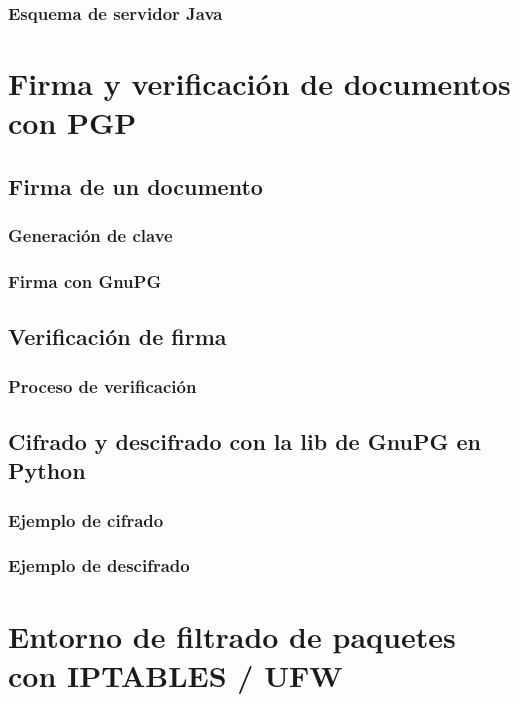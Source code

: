 \documentclass[12pt,a4paper]{article}
\begin{document}
\subsubsection{Esquema de servidor Java}



\section{Firma y verificación de documentos con PGP}
\subsection{Firma de un documento}
\subsubsection{Generación de clave}

\subsubsection{Firma con GnuPG}

\subsection{Verificación de firma}
\subsubsection{Proceso de verificación}

\subsection{Cifrado y descifrado con la lib de GnuPG en Python}
\subsubsection{Ejemplo de cifrado}

\subsubsection{Ejemplo de descifrado}

\section{Entorno de filtrado de paquetes con IPTABLES / UFW}
\end{document}
